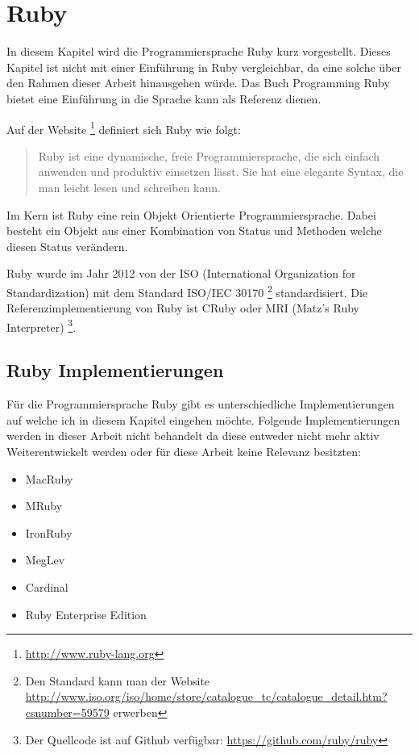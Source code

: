 \section{Ruby}
\label{section: Ruby}

In diesem Kapitel wird die Programmiersprache Ruby kurz vorgestellt. Dieses Kapitel ist nicht mit einer Einführung in Ruby vergleichbar, da eine solche über den Rahmen dieser Arbeit hinausgehen würde. Das Buch Programming Ruby \cite[]{Dav05} bietet eine Einführung in die Sprache kann als Referenz dienen. 

Auf der Website \footnote{\url{http://www.ruby-lang.org}} definiert sich Ruby wie folgt:

\begin{quote}
	Ruby ist eine dynamische, freie Programmiersprache, die sich einfach anwenden und produktiv einsetzen lässt. Sie hat eine elegante Syntax, die man leicht lesen und schreiben kann. \cite[]{Rub92}
\end{quote}

Im Kern ist Ruby eine rein Objekt Orientierte Programmiersprache. Dabei besteht ein Objekt aus einer Kombination von Status und Methoden welche diesen Status verändern. \cite[p. 1-2]{Dav05}

Ruby wurde im Jahr 2012 von der ISO (International Organization for Standardization) mit dem Standard ISO/IEC 30170 \footnote{Den Standard kann man der Website \url{http://www.iso.org/iso/home/store/catalogue_tc/catalogue_detail.htm?csnumber=59579} erwerben} standardisiert. Die Referenzimplementierung von Ruby ist CRuby oder MRI (Matz's Ruby Interpreter) \footnote{Der Quellcode ist auf Github verfügbar: \url{https://github.com/ruby/ruby}}.

\subsection{Ruby Implementierungen}

Für die Programmiersprache Ruby gibt es unterschiedliche Implementierungen auf welche ich in diesem Kapitel eingehen möchte. Folgende Implementierungen werden in dieser Arbeit nicht behandelt da diese entweder nicht mehr aktiv Weiterentwickelt werden oder für diese Arbeit keine Relevanz besitzten:

\begin{itemize}
  \item MacRuby
  \item MRuby
  \item IronRuby
  \item MegLev
  \item Cardinal
  \item Ruby Enterprise Edition
\end{itemize}

